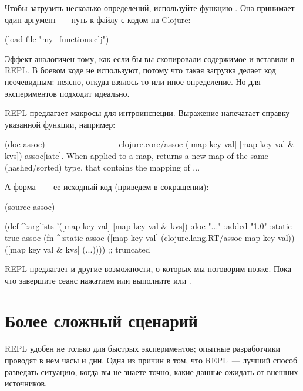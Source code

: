 Чтобы загрузить несколько определений, используйте функцию . Она принимает один аргумент~--- путь к файлу с кодом на Clojure:

\begin{english}
  \begin{clojure}
(load-file "my_functions.clj")
  \end{clojure}
\end{english}

Эффект аналогичен тому, как если бы вы скопировали содержимое и вставили в REPL. В боевом коде  не используют, потому что такая загрузка делает код неочевидным: неясно, откуда взялось то или иное определение. Но для экспериментов  подходит идеально.

REPL предлагает макросы для интроинспеции. Выражение  напечатает справку указанной функции, например:

\begin{english}
  \begin{text}
(doc assoc)
-------------------------
clojure.core/assoc
([map key val] [map key val & kvs])
  assoc[iate]. When applied to a map, returns a new map
    of the same (hashed/sorted) type, that contains the
    mapping of ...
  \end{text}
\end{english}

А форма ~--- ее исходный код (приведем в сокращении):

\begin{english}
  \begin{clojure}
(source assoc)

(def
 ^{:arglists '([map key val] [map key val & kvs])
   :doc "..."
   :added "1.0"
   :static true}
 assoc
 (fn ^:static assoc
   ([map key val] (clojure.lang.RT/assoc map key val))
   ([map key val & kvs]
    (...)))) ;; truncated
  \end{clojure}
\end{english}

REPL предлагает и другие возможности, о которых мы поговорим позже. Пока что завершите сеанс нажатием  или выполните  или .

\section{Более сложный сценарий}

REPL удобен не только для быстрых экспериментов; опытные разработчики проводят в нем часы и дни. Одна из причин в том, что REPL~--- лучший способ разведать ситуацию, когда вы не знаете точно, какие данные ожидать от внешних источников.

